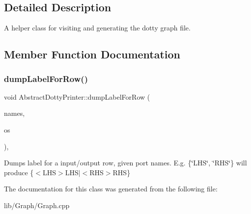 \subsection{Detailed Description}
A helper class for visiting and generating the dotty graph file. 

\subsection{Member Function Documentation}
\mbox{\label{class_abstract_dotty_printer_a16114210e14d5634d233f72872525611}} 
\subsubsection{\texorpdfstring{dump\+Label\+For\+Row()}{dumpLabelForRow()}}
{\footnotesize\ttfamily void Abstract\+Dotty\+Printer\+::dump\+Label\+For\+Row (\begin{DoxyParamCaption}\item[{llvm\+::\+Array\+Ref$<$ std\+::string $>$}]{names,  }\item[{std\+::ostream \&}]{os }\end{DoxyParamCaption})\hspace{0.3cm}{\ttfamily [inline]}, {\ttfamily [protected]}}

Dumps label for a input/output row, given port names. E.\+g. \{\char`\"{}\+L\+H\+S\char`\"{}, \char`\"{}\+R\+H\+S\char`\"{}\} will produce \{$<$\+L\+H\+S$>$L\+H\+S$\vert$$<$\+R\+H\+S$>$R\+HS\} 

The documentation for this class was generated from the following file\+:\begin{DoxyCompactItemize}
\item 
lib/\+Graph/Graph.\+cpp\end{DoxyCompactItemize}
